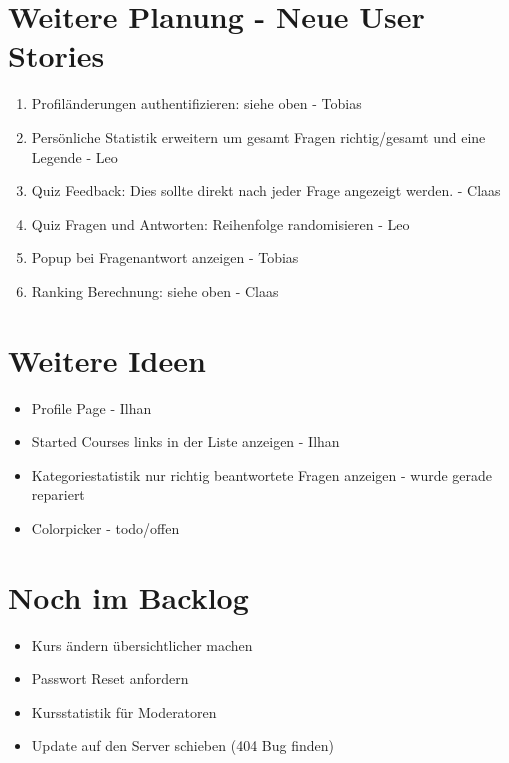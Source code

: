 \documentclass[colorback, accentcolor=tud1c, paper=a4]{tudexercise}
\begin{document}
\begin{multicols}{2}
\section*{Weitere Planung - Neue User Stories}
\begin{enumerate}
	\item Profiländerungen authentifizieren: siehe oben - Tobias
	\item Persönliche Statistik erweitern um gesamt Fragen richtig/gesamt und eine Legende - Leo
	\item Quiz Feedback: Dies sollte direkt nach jeder Frage angezeigt werden. - Claas
	\item Quiz Fragen und Antworten: Reihenfolge randomisieren - Leo
	\item Popup bei Fragenantwort anzeigen - Tobias
	\item Ranking Berechnung: siehe oben - Claas
\end{enumerate}

\section*{Weitere Ideen}
\begin{itemize}
	\item Profile Page - Ilhan
	\item Started Courses links in der Liste anzeigen - Ilhan
	\item Kategoriestatistik nur richtig beantwortete Fragen anzeigen - wurde gerade repariert
	\item Colorpicker - todo/offen
\end{itemize}

\section*{Noch im Backlog}
\begin{itemize}
	\item Kurs ändern übersichtlicher machen
	\item Passwort Reset anfordern
	\item Kursstatistik für Moderatoren
	\item Update auf den Server schieben (404 Bug finden)
\end{itemize}



\end{multicols}
\end{document}
